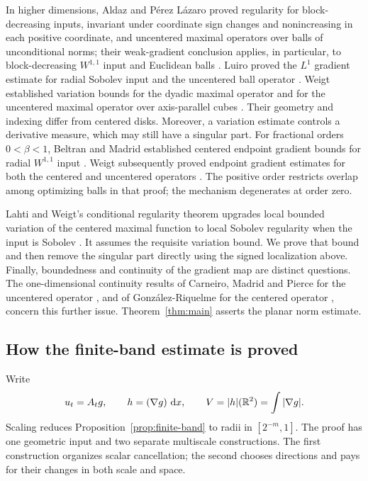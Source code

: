 In higher dimensions, Aldaz and P\'erez L\'azaro proved regularity for
block-decreasing inputs, invariant under coordinate sign changes and
nonincreasing in each positive coordinate, and uncentered maximal operators over balls of
unconditional norms; their weak-gradient conclusion applies, in particular,
to block-decreasing $W^{1,1}$ input and Euclidean balls
\cite[Theorem~11]{AldazPerezLazaro2009Block}.
Luiro proved the $L^1$ gradient estimate for
radial Sobolev input and the uncentered ball operator
\cite[Theorem~3.12]{Luiro2018Radial}.
Weigt established variation bounds for the dyadic maximal operator
\cite{Weigt2023Dyadic} and for the uncentered maximal operator over
axis-parallel cubes \cite[Theorem~1.1]{Weigt2025Cubes}.
Their geometry and indexing differ from centered disks. Moreover,
a variation estimate controls a derivative measure, which may still
have a singular part. For fractional orders $0<\beta<1$, Beltran and Madrid established
centered endpoint gradient bounds for radial $W^{1,1}$ input
\cite[Theorem~1.2]{BeltranMadrid2020CenteredFractional}.
Weigt subsequently proved endpoint gradient estimates for both
the centered and uncentered operators
\cite[Theorem~1.1]{Weigt2022Fractional}. The positive order restricts
overlap among optimizing balls in that proof; the mechanism
degenerates at order zero.

Lahti and Weigt's conditional regularity theorem upgrades local
bounded variation of the centered maximal function to local Sobolev
regularity when the input is Sobolev
\cite[Theorem~1.2]{LahtiWeigt2025}. It assumes the requisite variation
bound. We prove that bound and then remove the singular part directly
using the signed localization above. Finally, boundedness and
continuity of the gradient map are distinct questions. The
one-dimensional continuity results of Carneiro, Madrid and Pierce
for the uncentered operator \cite{CarneiroMadridPierce2017}, and of
Gonz\'alez-Riquelme for the centered operator
\cite{GonzalezRiquelme2023Continuity}, concern this further issue.
Theorem~\ref{thm:main} asserts the planar norm estimate.

\subsection{How the finite-band estimate is proved}

Write
\begin{equation}\label{eq:signed-average}
 u_t=A_tg,\qquad h=(\nabla g)\,\mathop{}\!\mathrm{d} x,\qquad
 V=|h|(\mathbb R^2)=\int|\nabla g|.
\end{equation} Scaling reduces
Proposition~\ref{prop:finite-band} to radii in $[2^{-m},1]$.
The proof has one geometric input and two separate multiscale
constructions. The first construction organizes scalar cancellation;
the second chooses directions and pays for their changes in both
scale and space.

